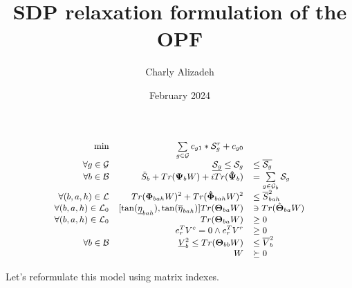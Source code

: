 \documentclass{article}
\title{SDP relaxation formulation of the OPF}
\author{Charly Alizadeh}
\date{February 2024}
\begin{document}
\maketitle

\begin{equation}
\begin{small}
\begin{array}{rrl}
    \min & \sum\limits_{g\in \mathcal{G}}c_{g1}*\mathcal{S}^r_g + c_{g0} &\\
    \forall g \in \mathcal{G} & \underline{\mathcal{S}_g} \leq \mathcal{S}_g  &\leq \overline{\mathcal{S}_g} \\
    \forall b \in \mathcal{B} & \tilde{S}_b + Tr(\mathbf{\Psi}_b W) + iTr(\mathbf{\hat{\Psi}}_b) &= \sum\limits_{g \in \mathcal{G}_b} \mathcal{S}_g\\
    \forall (b, a, h) \in \mathcal{L} & Tr(\mathbf{\Phi}_{bah}W)^2 + Tr(\mathbf{\hat{\Phi}}_{bah}W)^2 & \leq \overline{S}_{bah}^2 \\
    \forall (b, a, h) \in \mathcal{L}_0 & [\tan(\underline{\mathbf{\eta}}_{bah}), \tan({\overline{\mathbf{\eta}}_{bah}})]Tr(\mathbf{\Theta}_{ba}W) & \ni Tr(\hat{\mathbf{\Theta}}_{ba}W) \\
    \forall (b, a, h) \in \mathcal{L}_0 & Tr(\mathbf{\Theta}_{ba}W) &\geq 0 \\
                                    & e_r^TV^c= 0 \wedge e_r^TV^r &\geq 0 \\
    \forall b \in \mathcal{B} & \underline{V}_b^2 \leq Tr(\mathbf{\Theta}_{bb}W) &\leq \overline{V}_b^2 \\
                          & W &\succeq 0
\end{array}
\end{small}
\label{OPF}
\end{equation}

Let's reformulate this model using matrix indexes.\\

\end{document}
